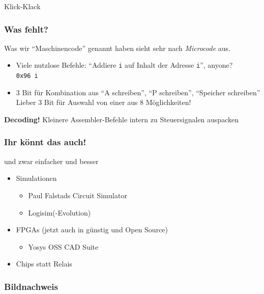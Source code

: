 \documentclass[t,aspectratio=169,usenames,dvipsnames]{beamer}
\begin{document}
\begin{frame}[c]
  \begin{center}
    \Huge{Klick-Klack}
  \end{center}
\end{frame}

\begin{frame}
  \frametitle{Was fehlt?}

  Was wir \enquote{Maschinencode} genannt haben sieht sehr nach \emph{Microcode} aus.
  \begin{itemize}
  \item Viele nutzlose Befehle: \enquote{Addiere \texttt{i} auf Inhalt der Adresse \texttt{i}}, anyone?\\
    \texttt{0x96 i}
  \item 3 Bit für Kombination aus \enquote{A schreiben}, \enquote{P schreiben}, \enquote{Speicher schreiben}\\
    Lieber 3 Bit für Auswahl von einer aus 8 Möglichkeiten!

  \end{itemize}

  \bigskip\pause

  \textbf{Decoding!} Kleinere Assembler-Befehle intern zu Steuersignalen auspacken
\end{frame}

\begin{frame}
  \frametitle{Ihr könnt das auch!}

  und zwar einfacher und besser
  \begin{itemize}
  \item Simulationen
    \begin{itemize}
    \item Paul Falstads Circuit Simulator
    \item Logisim(-Evolution)
    \end{itemize}
  \item FPGAs (jetzt auch in günstig und Open Source)
    \begin{itemize}
    \item Yosys OSS CAD Suite
    \end{itemize}
  \item Chips statt Relais
  \end{itemize}
\end{frame}

\begin{frame}
  \frametitle{Bildnachweis}
  \tiny
  \begin{description}
  \end{description}
\end{frame}
\end{document}
